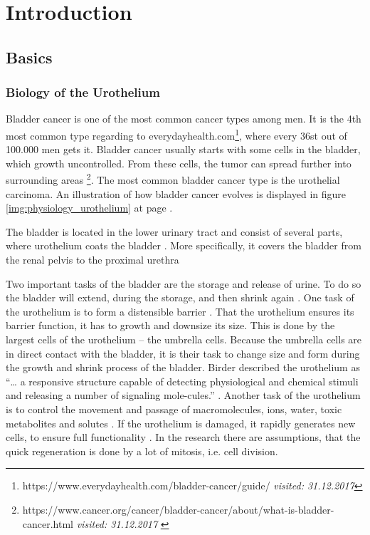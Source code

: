 \chapter{Introduction}
\section{Basics}
\subsection{Biology of the Urothelium}
Bladder cancer is one of the most common cancer types among men. It is the 4th most common type regarding to everydayhealth.com\footnote{https://www.everydayhealth.com/bladder-cancer/guide/ \textit{visited: 31.12.2017}}, where every 36st out of 100.000 men gets it. Bladder cancer usually starts with some cells in the bladder, which growth uncontrolled. From these cells, the tumor can spread further into surrounding areas \footnote{https://www.cancer.org/cancer/bladder-cancer/about/what-is-bladder-cancer.html \textit{visited: 31.12.2017} \label{ftn:cancer.org}}. The most common bladder cancer type is the urothelial carcinoma. An illustration of how bladder cancer evolves is displayed in figure \ref{img:physiology_urothelium} at page \pageref{img:physiology_urothelium}.

The bladder is located in the lower urinary tract and consist of several parts, where urothelium coats the bladder \cite{Lazzeri2006}. More specifically, it covers the bladder from the renal pelvis to the proximal urethra \cite{Yamany2014, Birder2005} 

Two important tasks of the bladder are the storage and release of urine. To do so the bladder will extend, during the storage, and then shrink again \cite{Karl-ErikAndersson2004}. One task of the urothelium is to form a distensible barrier \cite{Apodaca2004, Lazzeri2006, PuneetKhandelwal2009, WRCross2005}. That the urothelium ensures its barrier function, it has to growth and downsize its size. This is done by the largest cells of the urothelium – the umbrella cells. Because the umbrella cells are in direct contact with the bladder, it is their task to change size and form during the growth and shrink process of the bladder. Birder described the urothelium as “… a responsive structure capable of detecting physiological and chemical stimuli and releasing a number of signaling mole-cules.” \cite{Birder2005}. Another task of the urothelium is to control the movement and passage of macromolecules, ions, water, toxic metabolites and solutes \cite{Apodaca2004, PuneetKhandelwal2009}. If the urothelium is damaged, it rapidly generates new cells, to ensure full functionality \cite{Apodaca2004, Yamany2014, PuneetKhandelwal2009}. In the research there are assumptions, that the quick regeneration is done by a lot of mitosis, i.e. cell division.

